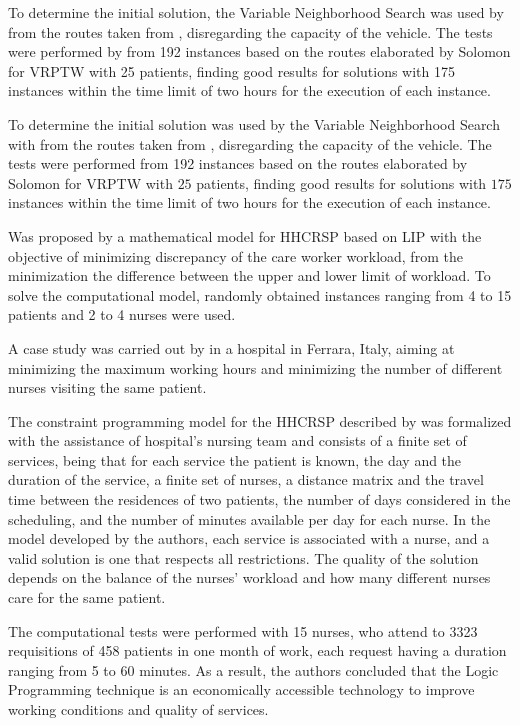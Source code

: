 To determine the initial solution, the Variable Neighborhood Search was used by  from the routes taken from , disregarding the capacity of the vehicle.
The tests were performed by  from 192 instances based on the routes elaborated by Solomon for \ac{VRPTW} with 25 patients, finding good results for solutions with 175 instances within the time limit of two hours for the execution of each instance.

To determine the initial solution was used by  the Variable Neighborhood Search with from the routes taken from , disregarding the capacity of the vehicle.
The tests were performed from 192 instances based on the routes elaborated by Solomon for \ac{VRPTW} with $25$ patients, finding good results for solutions with $175$ instances within the time limit of two hours for the execution of each instance.

Was proposed by  a mathematical model for \ac{HHCRSP} based on \ac{LIP} with the objective of minimizing discrepancy of the care worker workload, from the minimization the difference between the upper and lower limit of workload.
To solve the computational model, randomly obtained instances ranging from 4 to 15 patients and 2 to 4 nurses were used.

A case study was carried out by  in a hospital in Ferrara, Italy, aiming at minimizing the maximum working hours and minimizing the number of different nurses visiting the same patient.

The constraint programming model for the \ac{HHCRSP} described by  was formalized with the assistance of hospital's nursing team and consists of a finite set of services, being that for each service the patient is known, the day and the duration of the service, a finite set of nurses, a distance matrix and the travel time between the residences of two patients, the number of days considered in the scheduling, and the number of minutes available per day for each nurse.
In the model developed by the authors, each service is associated with a nurse, and a valid solution is one that respects all restrictions. The quality of the solution depends on the balance of the nurses' workload and how many different nurses care for the same patient.

The computational tests were performed with 15 nurses, who attend to 3323 requisitions of 458 patients in one month of work, each request having a duration ranging from 5 to 60 minutes. As a result, the authors concluded that the Logic Programming technique is an economically accessible technology to improve working conditions and quality of services.

